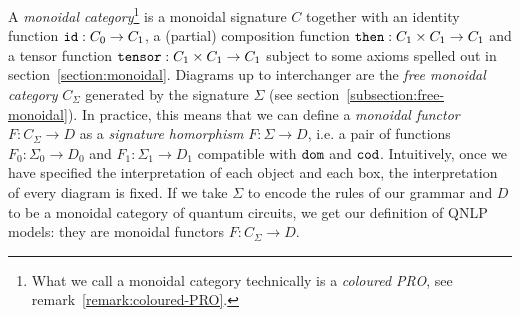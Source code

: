 A \emph{monoidal category}\footnote
{What we call a monoidal category technically is a \emph{coloured PRO}, see remark~\ref{remark:coloured-PRO}.} is a monoidal signature $C$ together with an identity function $\mathtt{id} : C_0 \to C_1$, a (partial) composition function $\mathtt{then} : C_1 \times C_1 \to C_1$ and a tensor function $\mathtt{tensor} : C_1 \times C_1 \to C_1$ subject to some axioms spelled out in section~\ref{section:monoidal}.
Diagrams up to interchanger are the \emph{free monoidal category} $C_\Sigma$ generated by the signature $\Sigma$ (see section~\ref{subsection:free-monoidal}).
In practice, this means that we can define a \emph{monoidal functor} $F : C_\Sigma \to D$ as a \emph{signature homorphism} $F : \Sigma \to D$, i.e. a pair of functions $F_0 : \Sigma_0 \to D_0$ and $F_1 : \Sigma_1 \to D_1$ compatible with $\mathtt{dom}$ and $\mathtt{cod}$.
Intuitively, once we have specified the interpretation of each object and each box, the interpretation of every diagram is fixed.
If we take $\Sigma$ to encode the rules of our grammar and $D$ to be a monoidal category of quantum circuits, we get our definition of QNLP models: they are monoidal functors $F : C_\Sigma \to D$.
